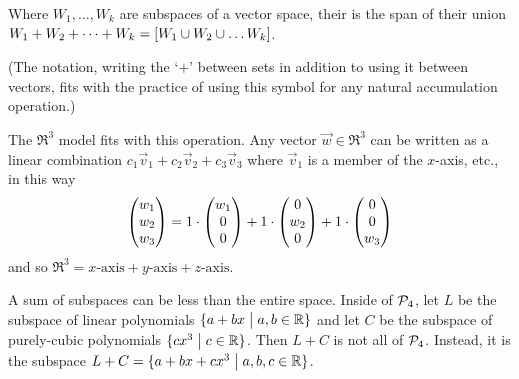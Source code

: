 \begin{definition}
Where \( W_1,\dots, W_k \) are subspaces of a vector space, their
is the span of their union
$W_1+W_2+\dots +W_k=\relax [W_1\cup W_2\cup \dots W_k\relax ]$.
\end{definition}

\noindent (The notation, writing the `\( + \)' between sets in addition to
using it  between vectors, fits with the practice of using this symbol for any
natural accumulation operation.)

\begin{example} \label{ex:RThreeSumAxes}
The $\Re^3$ model fits with this operation.
Any vector $\vec{w}\in\Re^3$ can be written as a linear combination
$c_1\vec{v}_1+c_2\vec{v}_2+c_3\vec{v}_3$ where $\vec{v}_1$ is a member of
the $x$-axis, etc., in this way
\begin{equation*}
    \begin{pmatrix} w_1 \\ w_2 \\ w_3 \end{pmatrix}
    =1\cdot\begin{pmatrix} w_1 \\ 0 \\ 0 \end{pmatrix}
    +1\cdot\begin{pmatrix} 0 \\ w_2 \\ 0 \end{pmatrix}
    +1\cdot\begin{pmatrix} 0 \\ 0 \\ w_3 \end{pmatrix}
\end{equation*}
and so $\Re^3=\text{$x$-axis}+\text{$y$-axis}+\text{$z$-axis}$.
\end{example}

\begin{example}
A sum of subspaces can be less than the entire space. 
Inside of  \( \mathcal{P}_4 \), 
let \( L \) be the subspace of linear polynomials
$\mbox{$\{a+bx\bigm| a,b\in\mathbb{R}\}$}$
and let \( C \) be the subspace of purely-cubic polynomials
\( \mbox{$\{cx^3\bigm| c\in\mathbb{R}\}$}\).
Then \mbox{$L+C$} is not all of $\mathcal{P}_4$.
Instead, it is the subspace
\( \mbox{$L+C$}=\mbox{$\{a+bx+cx^3\bigm| a,b,c\in\mathbb{R}\}$} \).
\end{example}

